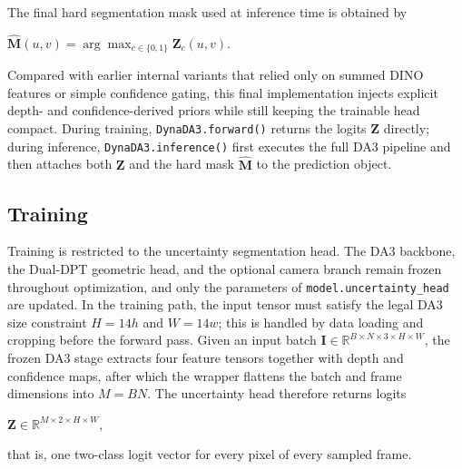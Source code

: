The final hard segmentation mask used at inference time is obtained by
\begin{center}
    $\displaystyle
    \hat{\mathbf{M}}(u,v)=\arg\max_{c\in\{0,1\}} \mathbf{Z}_{c}(u,v).
    $
\end{center}
Compared with earlier internal variants that relied only on summed DINO features or simple confidence gating, this final implementation injects explicit depth- and confidence-derived priors while still keeping the trainable head compact. During training, \texttt{DynaDA3.forward()} returns the logits $\mathbf{Z}$ directly; during inference, \texttt{DynaDA3.inference()} first executes the full DA3 pipeline and then attaches both $\mathbf{Z}$ and the hard mask $\hat{\mathbf{M}}$ to the prediction object.

\subsection{Training}
Training is restricted to the uncertainty segmentation head. The DA3 backbone, the Dual-DPT geometric head, and the optional camera branch remain frozen throughout optimization, and only the parameters of \texttt{model.uncertainty\_head} are updated. In the training path, the input tensor must satisfy the legal DA3 size constraint $H=14h$ and $W=14w$; this is handled by data loading and cropping before the forward pass. Given an input batch $\mathbf{I}\in\mathbb{R}^{B\times N\times 3\times H\times W}$, the frozen DA3 stage extracts four feature tensors together with depth and confidence maps, after which the wrapper flattens the batch and frame dimensions into $M=BN$. The uncertainty head therefore returns logits
\begin{center}
    $\displaystyle
    \mathbf{Z}\in\mathbb{R}^{M\times 2\times H\times W},
    $
\end{center}
that is, one two-class logit vector for every pixel of every sampled frame.

